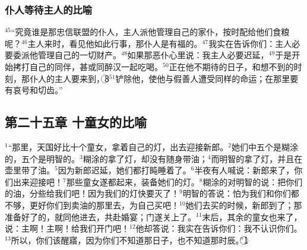 \subsubsection{仆人等待主人的比喻}
$^{45}$“究竟谁是那忠信联盟的仆人，主人派他管理自己的家仆，按时配给他们食粮呢？$^{46}$主人来时，看见他如此行事，那仆人是有福的。$^{47}$我实在告诉你们：主人必要委派他管理自己的一切财产。$^{48}$如果那恶仆心里说：我主人必要迟延，$^{49}$于是开始拷打自己的同伴，甚或同醉汉一起吃喝。$^{50}$正在他不期待的日子，和想不到的时刻，那仆人的主人要来到，\textcircled{8}$^{51}$铲除他，使他与假善人遭受同样的命运；在那里要有哀号和切齿。”


\subsection{第二十五章 十童女的比喻}
$^{1}$“那里，天国好比十个童女，拿着自己的灯，出去迎接新郎。$^{2}$她们中五个是糊涂的，五个是明智的。$^{3}$糊涂的拿了灯，却没有随身带油；$^{4}$而明智的拿了灯，并且在壶里带了油。$^{5}$因为新郎迟延，她们都打盹睡着了。$^{6}$半夜有人喊说：新郎来了，你们出来迎接吧！$^{7}$那些童女遂都起来，装备她们的灯。$^{8}$糊涂的对明智的说：把你们的油，分些给我们吧！因为我们的灯快要灭了！$^{9}$明智的答说：怕为我们和你们都不够，更好你们到卖油的那里去，为自己买吧！$^{10}$她们去买的时候，新郎到了；那准备好了的，就同他进去，共赴婚宴；门遂关上了。$^{11}$末后，其余的童女也来了，说：主啊！主啊！给我们开门吧！$^{12}$他却答说：我实在告诉你们：我不认识你们。$^{13}$所以，你们该醒寤，因为你们不知道那日子，也不知道那时辰。”\textcircled{1}


